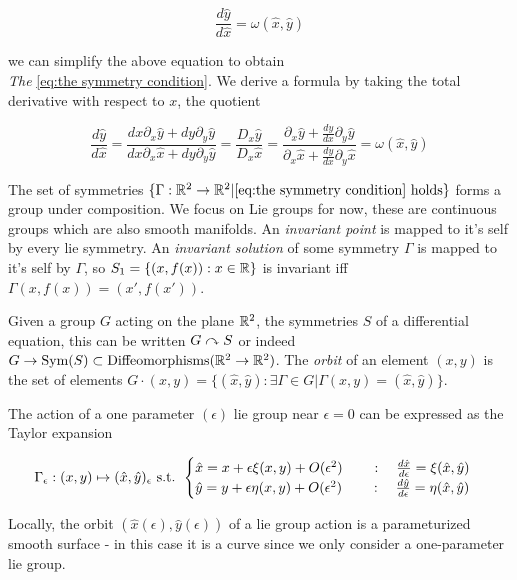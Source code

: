 \documentclass[12pt]{article}
\begin{document}
$$\frac{d\hat y}{d\hat x} = \omega(\hat x,\hat y)$$

we can simplify the above equation to obtain\\ \textit{The } \eqref{eq:the symmetry condition}. We derive a formula by taking the total derivative with respect to $x$, the quotient 

\begin{equation}\label{eq:the symmetry condition}
    \frac{d\hat y}{d\hat x} = \frac{dx \partial_x \hat y + dy \partial_y\hat y}{dx \partial_x \hat x + dy\partial_y \hat y} = \frac{D_x \hat y}{D_x \hat x} = \frac{\partial_x \hat y + \frac{dy}{dx}\partial_y\hat y}{\partial_x \hat x + \frac{dy}{dx}\partial_y\hat x} = \omega(\hat x,\hat y)
\end{equation}

The set of symmetries $\{\Gamma : \mathbb{R}^2\to\mathbb{R}^2 | \eqref{eq:the symmetry condition}\,\,\text{holds} \}$ forms a group under composition. We focus on Lie groups for now, these are continuous groups which are also smooth manifolds. An \textit{invariant point} is mapped to it's self by every lie symmetry. An \textit{invariant solution} of some symmetry $\Gamma$ is mapped to it's self by $\Gamma$, so $S_1 = \{(x,f(x)) : x\in \mathbb{R}\}$ is invariant iff $\Gamma(x,f(x)) = (x' , f( x'))$.  

Given a group $G$ acting on the plane $\mathbb{R}^2$, the symmetries $S$ of a differential equation, this can be written $G\curvearrowright S$ or indeed $G\to \text{Sym}(S)\subset \text{Diffeomorphisms}( \mathbb{R}^2\to\mathbb{R}^2 )$. The \textit{orbit} of an element $(x,y)$ is the set of elements $G \cdot (x,y) = \{(\hat x, \hat y) : \exists \Gamma\in G | \Gamma (x,y) = (\hat x,\hat y) \}$. 

The action of a one parameter $(\epsilon)$ lie group near $\epsilon=0$ can be expressed as the Taylor expansion

\begin{equation}\label{eq:one param lie group taylor}
    \Gamma_\epsilon : (x,y)\mapsto (\hat x,\hat y)_\epsilon\text{ s.t. } \begin{cases}\hat x = x + \epsilon \xi(x,y) + O(\epsilon^2)\qquad : \quad \frac{d\hat x}{d\epsilon} = \xi(\hat x,\hat y) \\ \hat y = y + \epsilon\eta(x,y) + O(\epsilon^2) \qquad :\quad \frac{d\hat y}{d\epsilon} = \eta(\hat x,\hat y) \end{cases}
\end{equation}

Locally, the orbit $(\hat x(\epsilon),\hat y(\epsilon))$ of a lie group action is a parameturized smooth surface - in this case it is a curve since we only consider a one-parameter lie group. 
\end{document}
